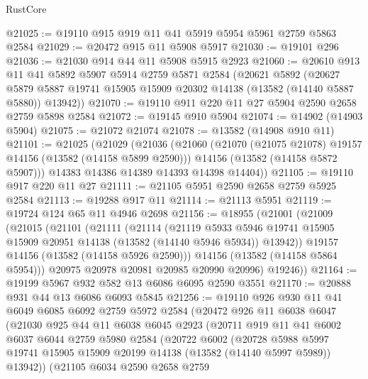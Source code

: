 \begin{lexlean}{RustCore}
\begin{coremodule}
@21025 := @19110 @915 @919 @11 @41 @5919 @5954 @5961 @2759 @5863 @2584
@21029 := @20472 @915 @11 @5908 @5917
@21030 := @19101 @296
@21036 := @21030 @914 @44 @11 @5908 @5915 @2923
@21060 := @20610
    @913
    @11
    @41
    @5892
    @5907
    @5914
    @2759
    @5871
    @2584
    (@20621
      @5892
      (@20627 @5879 @5887 @19741 @15905 @15909 @20302 @14138 (@13582 (@14140 @5887 @5880)) @13942))
@21070 := @19110 @911 @220 @11 @27 @5904 @2590 @2658 @2759 @5898 @2584
@21072 := @19145 @910 @5904
@21074 := @14902 (@14903 @5904)
@21075 := @21072 @21074
@21078 := @13582 (@14908 @910 @11)
@21101 := @21025
    (@21029
      (@21036
        (@21060
          (@21070 (@21075 @21078) @19157 @14156 (@13582 (@14158 @5899 @2590)))
          @14156
          (@13582 (@14158 @5872 @5907)))
        @14383
        @14386
        @14389
        @14393
        @14398
        @14404))
@21105 := @19110 @917 @220 @11 @27
@21111 := @21105 @5951 @2590 @2658 @2759 @5925 @2584
@21113 := @19288 @917 @11
@21114 := @21113 @5951
@21119 := @19724 @124 @65 @11 @4946 @2698
@21156 := @18955
    (@21001
      (@21009
        (@21015
          (@21101
            (@21111
              (@21114
                (@21119
                  @5933
                  @5946
                  @19741
                  @15905
                  @15909
                  @20951
                  @14138
                  (@13582 (@14140 @5946 @5934))
                  @13942))
              @19157
              @14156
              (@13582 (@14158 @5926 @2590)))
            @14156
            (@13582 (@14158 @5864 @5954)))
          @20975
          @20978
          @20981
          @20985
          @20990
          @20996)
        @19246))
@21164 := @19199 @5967 @932 @582 @13 @6086 @6095 @2590 @3551
@21170 := @20888 @931 @44 @13 @6086 @6093 @5845
@21256 := @19110
    @926
    @930
    @11
    @41
    @6049
    @6085
    @6092
    @2759
    @5972
    @2584
    (@20472
      @926
      @11
      @6038
      @6047
      (@21030
        @925
        @44
        @11
        @6038
        @6045
        @2923
        (@20711
          @919
          @11
          @41
          @6002
          @6037
          @6044
          @2759
          @5980
          @2584
          (@20722
            @6002
            (@20728
              @5988
              @5997
              @19741
              @15905
              @15909
              @20199
              @14138
              (@13582 (@14140 @5997 @5989))
              @13942))
          (@21105
            @6034
            @2590
            @2658
            @2759

\end{coremodule}
\end{lexlean}
